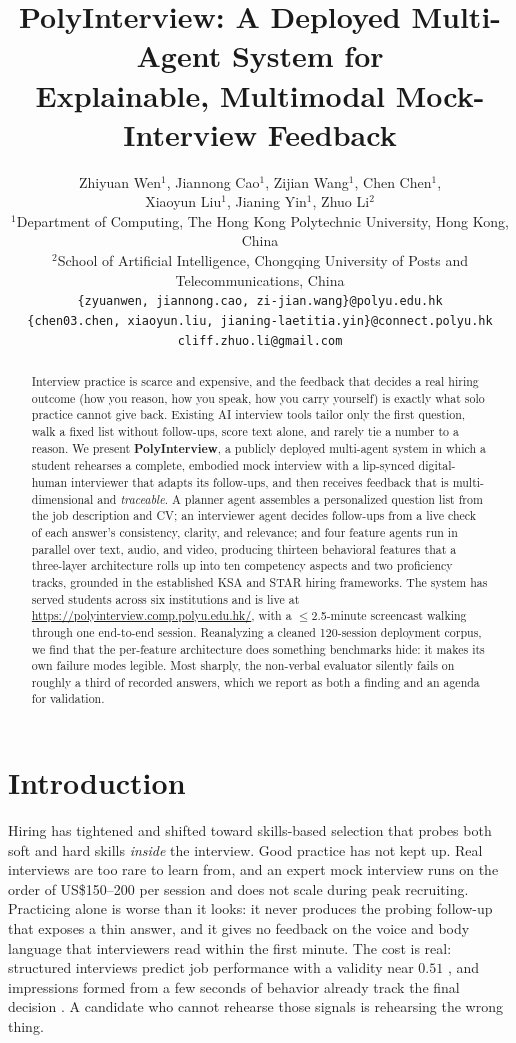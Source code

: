 \documentclass[11pt]{article}
\title{PolyInterview: A Deployed Multi-Agent System for\\ Explainable, Multimodal Mock-Interview Feedback}
\author{
  Zhiyuan Wen$^{1}$, Jiannong Cao$^{1}$, Zijian Wang$^{1}$, Chen Chen$^{1}$, \\
  Xiaoyun Liu$^{1}$, Jianing Yin$^{1}$, Zhuo Li$^{2}$ \\[3pt]
  \normalfont $^{1}$Department of Computing, The Hong Kong Polytechnic University, Hong Kong, China \\
  \normalfont $^{2}$School of Artificial Intelligence, Chongqing University of Posts and Telecommunications, China \\[3pt]
  \normalfont\texttt{\{zyuanwen, jiannong.cao, zi-jian.wang\}@polyu.edu.hk} \\
  \normalfont\texttt{\{chen03.chen, xiaoyun.liu, jianing-laetitia.yin\}@connect.polyu.hk} \\
  \normalfont\texttt{cliff.zhuo.li@gmail.com}
}
\begin{document}
\maketitle

\begin{abstract}
Interview practice is scarce and expensive, and the feedback that decides a real hiring outcome (how you reason, how you speak, how you carry yourself) is exactly what solo practice cannot give back. Existing AI interview tools tailor only the first question, walk a fixed list without follow-ups, score text alone, and rarely tie a number to a reason. We present \textbf{PolyInterview}, a publicly deployed multi-agent system in which a student rehearses a complete, embodied mock interview with a lip-synced digital-human interviewer that adapts its follow-ups, and then receives feedback that is multi-dimensional and \emph{traceable}. A planner agent assembles a personalized question list from the job description and CV; an interviewer agent decides follow-ups from a live check of each answer's consistency, clarity, and relevance; and four feature agents run in parallel over text, audio, and video, producing thirteen behavioral features that a three-layer architecture rolls up into ten competency aspects and two proficiency tracks, grounded in the established KSA and STAR hiring frameworks. The system has served students across six institutions and is live at \url{https://polyinterview.comp.polyu.edu.hk/}, with a $\leq$2.5-minute screencast walking through one end-to-end session. Reanalyzing a cleaned 120-session deployment corpus, we find that the per-feature architecture does something benchmarks hide: it makes its own failure modes legible. Most sharply, the non-verbal evaluator silently fails on roughly a third of recorded answers, which we report as both a finding and an agenda for validation.
\end{abstract}

\section{Introduction}
Hiring has tightened and shifted toward skills-based selection that probes both soft and hard skills \emph{inside} the interview. Good practice has not kept up. Real interviews are too rare to learn from, and an expert mock interview runs on the order of US\$150--200 per session and does not scale during peak recruiting. Practicing alone is worse than it looks: it never produces the probing follow-up that exposes a thin answer, and it gives no feedback on the voice and body language that interviewers read within the first minute. The cost is real: structured interviews predict job performance with a validity near $0.51$ \citep{schmidt1998validity}, and impressions formed from a few seconds of behavior already track the final decision \citep{ambady1992thin}. A candidate who cannot rehearse those signals is rehearsing the wrong thing.
\end{document}
